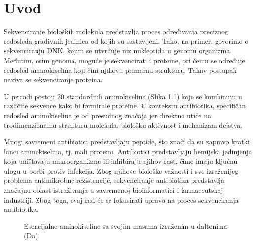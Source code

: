 \documentclass[12pt,oneside]{memoir}
\begin{document}

\frontmatter
\naslovna
\komisija
{}
\apstrakt
\tableofcontents*

\mainmatter

\chapter{Uvod}
Sekvenciranje bioloških molekula predstavlja proces određivanja preciznog redosleda gradivnih jedinica od kojih su sastavljeni. Tako, na primer, govorimo o sekvenciranju DNK, kojim se utvrđuje niz nukleotida u genomu organizma. Međutim, osim genoma, moguće je sekvencirati i proteine, pri čemu se određuje redosled aminokiselina koji čini njihovu primarnu strukturu. Takav postupak naziva se sekvenciranje proteina.

U prirodi postoji 20 standardnih aminokiselina (Slika \ref{fig:aminokiseline}) koje se kombinuju u različite sekvence kako bi formirale proteine. U kontekstu antibiotika, specifičan redosled aminokiselina je od presudnog značaja jer direktno utiče na trodimenzionalnu strukturu molekula, biološku aktivnost i mehanizam dejstva.

Mnogi savremeni antibiotici predstavljaju peptide, što znači da su zapravo kratki lanci aminokiselina, tj. mali proteini. Antibiotici predstavljaju hemijska jedinjenja koja uništavaju mikroorganizme ili inhibiraju njihov rast, čime imaju ključnu ulogu u borbi protiv infekcija. Zbog njihove biološke važnosti i sve izraženijeg problema antimikrobne rezistencije, sekvenciranje antibiotika predstavlja značajnu oblast istraživanja u savremenoj bioinformatici i farmaceutskoj industriji. Zbog toga, ovaj rad će se fokusirati upravo na proces sekvenciranja antibiotika.

\begin{figure}[h]
  \centering
  
  \caption{Esencijalne aminokiseline sa svojim masama izraženim u daltonima (Da)}
  \label{fig:aminokiseline}
\end{figure}
\end{document}
